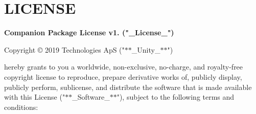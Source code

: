 \chapter{LICENSE}
\hypertarget{md__hey_tea_9_2_library_2_package_cache_2com_8unity_8searcher_0d4_89_82_2_l_i_c_e_n_s_e}{}\label{md__hey_tea_9_2_library_2_package_cache_2com_8unity_8searcher_0d4_89_82_2_l_i_c_e_n_s_e}
{\bfseries{ Companion Package License v1. ("{}\+\_\+\+License\+\_\+"{})}}

Copyright © 2019  Technologies ApS ("{}\texorpdfstring{$\ast$}{*}\texorpdfstring{$\ast$}{*}\+\_\+\+Unity\+\_\+\texorpdfstring{$\ast$}{*}\texorpdfstring{$\ast$}{*}"{})

 hereby grants to you a worldwide, non-\/exclusive, no-\/charge, and royalty-\/free copyright license to reproduce, prepare derivative works of, publicly display, publicly perform, sublicense, and distribute the software that is made available with this License ("{}\texorpdfstring{$\ast$}{*}\texorpdfstring{$\ast$}{*}\+\_\+\+Software\+\_\+\texorpdfstring{$\ast$}{*}\texorpdfstring{$\ast$}{*}"{}), subject to the following terms and conditions\+:


